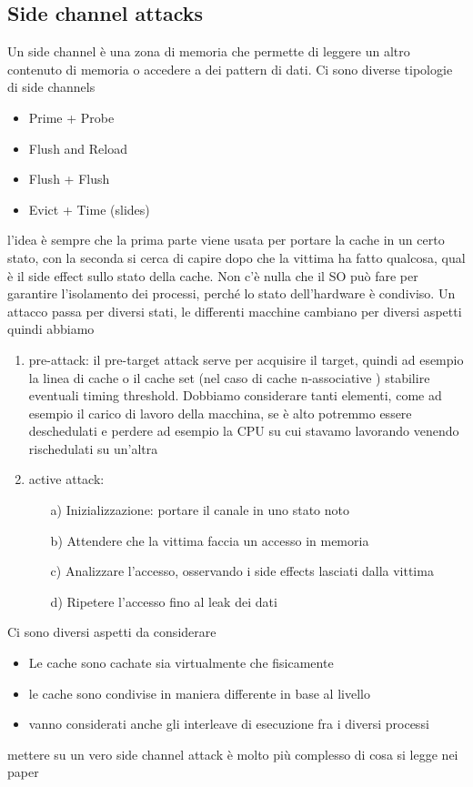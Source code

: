 \documentclass[12pt, oneside]{extbook} %
\begin{document}
\subsection{Side channel attacks}
Un side channel è una zona di memoria che permette di leggere un altro contenuto di memoria o accedere a dei pattern di dati. Ci sono diverse tipologie di side channels
\begin{itemize}
\item Prime + Probe
\item Flush and Reload
\item Flush + Flush
\item Evict + Time
(slides)
\end{itemize}
l'idea è sempre che la prima parte viene usata per portare la cache in un certo stato, con la seconda si cerca di capire dopo che la vittima ha fatto qualcosa, qual è il side effect sullo stato della cache. Non c'è nulla che il SO può fare per garantire l'isolamento dei processi, perché lo stato dell'hardware è condiviso. Un attacco passa per diversi stati, le differenti macchine cambiano per diversi aspetti quindi abbiamo
\begin{enumerate}
\item pre-attack: il pre-target attack serve per acquisire il target, quindi ad esempio la linea di cache o il cache set (nel caso di cache n-associative ) stabilire eventuali timing threshold. Dobbiamo considerare tanti elementi, come ad esempio il carico di lavoro della macchina, se è alto potremmo essere deschedulati e perdere ad esempio la CPU su cui stavamo lavorando venendo rischedulati su un'altra
\item active attack:
\begin{itemize}
\item[a)] Inizializzazione: portare il canale in uno stato noto
\item[b)] Attendere che la vittima faccia un accesso in memoria
\item[c)] Analizzare l'accesso, osservando i side effects lasciati dalla vittima
\item[d)] Ripetere l'accesso fino al leak dei dati
\end{itemize}
\end{enumerate}
Ci sono diversi aspetti da considerare
\begin{itemize}
\item Le cache sono cachate sia virtualmente che fisicamente
\item le cache sono condivise in maniera differente in base al livello
\item vanno considerati anche gli interleave di esecuzione fra i diversi processi
\end{itemize}
mettere su un vero side channel attack è molto più complesso di cosa si legge nei paper
\end{document}
